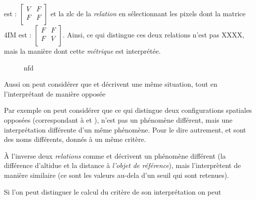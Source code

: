 est : \(\left[\begin{smallmatrix}V&F\\F&F\\\end{smallmatrix}\right]\) et la \ac{zlc} de la \emph{relation}  en sélectionnant les pixels dont la matrice 4IM est : \(\left[\begin{smallmatrix}F&F\\F&V\\\end{smallmatrix}\right]\). Ainsi, ce qui distingue ces deux relations n'est pas XXXX, mais la manière dont cette \emph{métrique} est interprétée.

\begin{figure}
  \centering
  
  \caption{nfd}
  \label{fig:Exemple_Metrique_vs_Selecteur}
\end{figure}

%
Aussi on peut considérer que  et  décrivent une même situation, tout en l'interprétant de manière opposée

Par exemple on peut considérer que ce qui distingue deux configurations spatiales opposées (\eg correspondant à  et ), n'est pas un phénomène différent, mais une interprétation différente d'un même phénomène. Pour le dire autrement,  et  sont des noms différents, donnés à un même critère.

À l'inverse deux \emph{relations} comme  et  décrivent un phénomène différent (\ie la différence d'altidue et la distance à \emph{l'objet de référence}), mais l’interprètent de manière similaire (ce sont les valeurs au-dela d'un seuil qui sont retenues).

%
Si l'on peut distinguer le calcul du critère de son interprétation on peut

